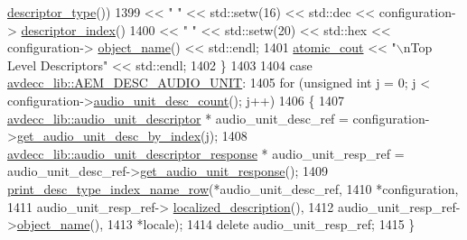 \begin{DoxyCode}
      \hyperlink{classavdecc__lib_1_1descriptor__base_a5112b70022171063ec5d3242bee9910e}{descriptor\_type}())
1399                         << \textcolor{stringliteral}{"   "} << std::setw(16) << std::dec << configuration->
      \hyperlink{classavdecc__lib_1_1descriptor__base_a7eed5583bffdf72d89021b188648c1b5}{descriptor\_index}()
1400                         << \textcolor{stringliteral}{"   "} << std::setw(20) << std::hex << configuration->
      \hyperlink{classavdecc__lib_1_1configuration__descriptor_a133f7774946d80f82b8aaaa4cfbb7361}{object\_name}() << std::endl;
1401             \hyperlink{cmd__line_8h_a0bc38ccc65c79ba06c6fcd7b4bf554c3}{atomic\_cout} << \textcolor{stringliteral}{"\(\backslash\)nTop Level Descriptors"} << std::endl;
1402         \}
1403 
1404         \textcolor{keywordflow}{case} \hyperlink{namespaceavdecc__lib_ac7b7d227e46bc72b63ee9e9aae15902fa141a799bfb339b5ff7543722da1119e2}{avdecc\_lib::AEM\_DESC\_AUDIO\_UNIT}:
1405             \textcolor{keywordflow}{for} (\textcolor{keywordtype}{unsigned} \textcolor{keywordtype}{int} j = 0; j < configuration->\hyperlink{classavdecc__lib_1_1configuration__descriptor_a1b8da825afb3257bca8a6506b9f021c9}{audio\_unit\_desc\_count}(); j++)
1406             \{
1407                 \hyperlink{classavdecc__lib_1_1audio__unit__descriptor}{avdecc\_lib::audio\_unit\_descriptor} * audio\_unit\_desc\_ref = 
      configuration->\hyperlink{classavdecc__lib_1_1configuration__descriptor_aa723a66eba00ad8c8f5361951f5af6e7}{get\_audio\_unit\_desc\_by\_index}(j);
1408                 \hyperlink{classavdecc__lib_1_1audio__unit__descriptor__response}{avdecc\_lib::audio\_unit\_descriptor\_response} * 
      audio\_unit\_resp\_ref = audio\_unit\_desc\_ref->\hyperlink{classavdecc__lib_1_1audio__unit__descriptor_a1bc85ccfad8fa58cab10f58a6797919d}{get\_audio\_unit\_response}();
1409                 \hyperlink{classcmd__line_ac47c21c03b69593b74e7c43201d0ba41}{print\_desc\_type\_index\_name\_row}(*audio\_unit\_desc\_ref,
1410                                                *configuration,
1411                                                audio\_unit\_resp\_ref->
      \hyperlink{classavdecc__lib_1_1audio__unit__descriptor__response_a1fb9de45567df344090a1407aa6b775f}{localized\_description}(),
1412                                                audio\_unit\_resp\_ref->\hyperlink{classavdecc__lib_1_1descriptor__response__base_a133f7774946d80f82b8aaaa4cfbb7361}{object\_name}(),
1413                                                *locale);
1414                 \textcolor{keyword}{delete} audio\_unit\_resp\_ref;
1415             \}

\end{DoxyCode}
